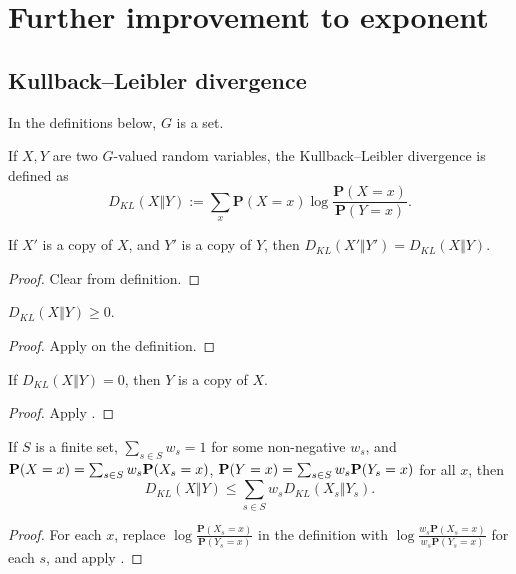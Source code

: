 \chapter{Further improvement to exponent}

\section{Kullback--Leibler divergence}

In the definitions below, $G$ is a set.

\begin{definition}\label{kl-div}\leanok If $X,Y$ are two $G$-valued random variables, the Kullback--Leibler divergence is defined as
  $$ D_{KL}(X\Vert Y) := \sum_x \mathbf{P}(X=x) \log \frac{\mathbf{P}(X=x)}{\mathbf{P}(Y=x)}.$$
\end{definition}

\begin{lemma}\label{kl-div-copy}\leanok  If $X'$ is a copy of $X$, and $Y'$ is a copy of $Y$, then $D_{KL}(X'\Vert Y') = D_{KL}(X\Vert Y)$.
\end{lemma}

\begin{proof}  Clear from definition.
\end{proof}

\begin{lemma}\label{Gibbs}\leanok  $D_{KL}(X\Vert Y) \geq 0$.
\end{lemma}

\begin{proof}
  Apply  on the definition.
\end{proof}

\begin{lemma}\label{Gibbs-converse}\leanok  If $D_{KL}(X\Vert Y) = 0$, then $Y$ is a copy of $X$.
\end{lemma}

\begin{proof}
  Apply .
\end{proof}

\begin{lemma}\label{kl-div-convex}\leanok  If $S$ is a finite set, $\sum_{s \in S} w_s = 1$ for some non-negative $w_s$, and ${\bf P}(X=x) = \sum_{s\in S} w_s  {\bf P}(X_s=x)$, ${\bf P}(Y=x) = \sum_{s\in S} w_s  {\bf P}(Y_s=x)$ for all $x$, then
$$D_{KL}(X\Vert Y) \le \sum_{s\in S} w_s D_{KL}(X_s\Vert Y_s).$$
\end{lemma}
\begin{proof}
For each $x$, replace $\log \frac{\mathbf{P}(X_s=x)}{\mathbf{P}(Y_s=x)}$ in the definition with $\log \frac{w_s\mathbf{P}(X_s=x)}{w_s\mathbf{P}(Y_s=x)}$ for each $s$, and apply .
\end{proof}


